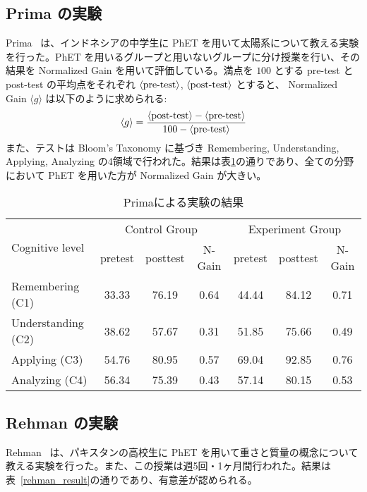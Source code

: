 \subsection*{Prima の実験}

Prima~\cite{prima_learning_2018} は、インドネシアの中学生に PhET を用いて太陽系について教える実験を行った。PhET を用いるグループと用いないグループに分け授業を行い、その結果を Normalized Gain を用いて評価している。満点を $100$ とする pre-test と post-test の平均点をそれぞれ $\langle \textrm{pre\\-test} \rangle$, $\langle \textrm{post\\-test} \rangle$ とすると、 Normalized Gain $\langle g \rangle$ は以下のように求められる:
$$ \langle g \rangle = \dfrac{\langle \textrm{post\\-test} \rangle - \langle \textrm{pre\\-test} \rangle}{100 - \langle \textrm{pre\\-test} \rangle} $$
また、テストは Bloom's Taxonomy に基づき Remembering, Understanding, Applying, Analyzing の4領域で行われた。結果は表\ref{prima_table}の通りであり、全ての分野において PhET を用いた方が Normalized Gain が大きい。

\begin{table}[htb]
\centering
\begin{tabular}{lcccccc}
  \toprule
  \multirow{2}{*}{Cognitive level} & \multicolumn{3}{c}{Control Group} & \multicolumn{3}{c}{Experiment Group}\\
  \cmidrule(lr){2-4} \cmidrule(lr){5-7}
  & pretest & posttest & N-Gain & pretest & posttest & N-Gain\\
  \midrule
  Remembering (C1) & 33.33 & 76.19 & 0.64 & 44.44 & 84.12 & 0.71\\
  Understanding (C2) & 38.62 & 57.67 & 0.31 & 51.85 & 75.66 & 0.49\\
  Applying (C3) & 54.76 & 80.95 & 0.57 & 69.04 & 92.85 & 0.76\\
  Analyzing (C4) & 56.34 & 75.39 & 0.43 & 57.14 & 80.15 & 0.53\\
  \bottomrule
\end{tabular}

\caption{Primaによる実験の結果}
\label{prima_table}
\end{table}

\subsection*{Rehman の実験}
Rehman~\cite{rehman_teaching_2021} は、パキスタンの高校生に PhET を用いて重さと質量の概念について教える実験を行った。また、この授業は週5回・1ヶ月間行われた。結果は表~\ref{rehman_result}の通りであり、有意差が認められる。


